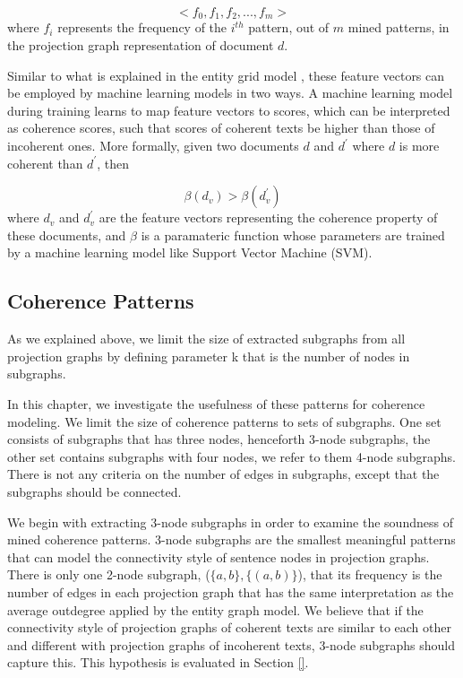 \begin{equation}
<f_0,f_1,f_2,...,f_m>
\end{equation}
%
where $f_i$ represents the frequency of the $i^{th}$ pattern, out of $m$ mined patterns, in the projection graph representation of document $d$. 

Similar to what is explained in the entity grid model \cite{barzilay08b}, these feature vectors can be employed by machine learning models in two ways. 
A machine learning model during training learns to map feature vectors to  scores, which can be interpreted as coherence scores, such that scores of  coherent texts be higher than those of incoherent ones. 
More formally, given two documents $d$ and $d^\prime$ where $d$ is more coherent than $d^\prime$, then 

\begin{equation}
\beta ( d_v) > \beta (d^\prime_v)
\end{equation}
%
where $d_v$ and $d^\prime_v$ are the feature vectors representing the coherence property of these documents, and $\beta$ is a paramateric function whose parameters are trained by a machine learning model like Support Vector Machine (SVM).


\subsection{Coherence Patterns}
\label{subsec:coherence_patterns}
%
As we explained above, we limit the size of extracted subgraphs from all projection graphs by defining parameter k that is the number of nodes in subgraphs. 

In this chapter, we investigate the usefulness of these patterns for coherence modeling. 
We limit the size of coherence patterns to sets of subgraphs. 
One set consists of subgraphs that has three nodes, henceforth 3-node subgraphs, the other set contains subgraphs with four nodes, we refer to them 4-node subgraphs. 
There is not any criteria on the number of edges in subgraphs, except that the subgraphs should be connected. 

We begin with extracting 3-node subgraphs in order to examine the soundness of mined coherence patterns.  
3-node subgraphs are the smallest meaningful patterns that can model the connectivity style of sentence nodes in projection graphs. 
There is only one 2-node subgraph, ($\lbrace a,b \rbrace,\lbrace \left( a, b\right) \rbrace$), that its frequency is the number of edges in each projection graph that has the same interpretation as the average outdegree applied by the entity graph model.  
We believe that if the connectivity style of projection graphs of coherent texts are similar to each other and different with projection graphs of incoherent texts, 3-node subgraphs should capture this. 
This hypothesis is evaluated in Section \ref{}.


